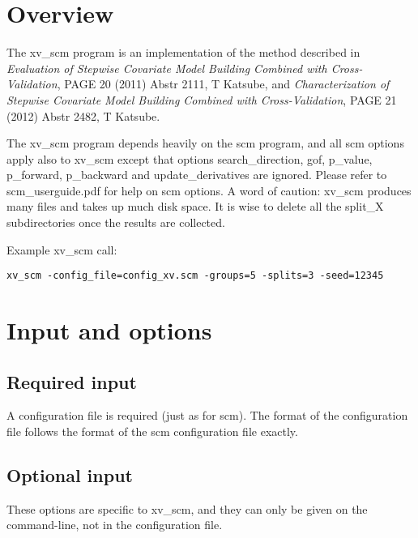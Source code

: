 



\maketitle


\section{Overview}
The xv\_scm program is an implementation of the method described in 
\emph{Evaluation of Stepwise Covariate Model Building Combined with Cross-Validation},
PAGE 20 (2011) Abstr 2111, T Katsube, and 
\emph{Characterization of Stepwise Covariate Model Building Combined with Cross-Validation},
PAGE 21 (2012) Abstr 2482, T Katsube. 


The xv\_scm program
depends heavily on the scm program, and all scm options apply also to xv\_scm except that options search\_direction, gof, p\_value, p\_forward, p\_backward and update\_derivatives are ignored. Please refer to scm\_userguide.pdf for help on scm options.
A word of caution: xv\_scm produces many files and takes up much disk space. It is wise to delete all the split\_X subdirectories once the results are collected.

Example xv\_scm call:
\begin{verbatim}
xv_scm -config_file=config_xv.scm -groups=5 -splits=3 -seed=12345
\end{verbatim}

\section{Input and options}

\subsection{Required input}
A configuration file is required (just as for scm).  The format of the configuration file follows the format of the scm configuration file exactly.

\subsection{Optional input}

These options are specific to xv\_scm, and they can only be given on the command-line, not in the configuration file.

